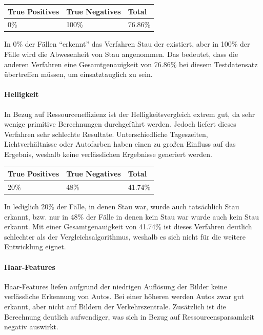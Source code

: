 \begin{center}
\scriptsize
    \begin{tabular}{ | l | l | l |}
    \hline
		True Positives & True Negatives & Total \\ \hline
    0\% &
		100\% &
		76.86\% \\
    \hline
    \end{tabular}
\end{center}

In 0\% der Fällen "`erkennt"' das Verfahren Stau der existiert, aber in 100\% der Fälle wird die Abwesenheit von Stau angenommen. Das bedeutet, dass die anderen Verfahren eine Gesamtgenauigkeit von 76.86\% bei diesem Testdatensatz übertreffen müssen, um einsatztauglich zu sein.

\paragraph{Helligkeit}
In Bezug auf Ressourceneffizienz ist der Helligkeitsvergleich extrem gut, da sehr wenige primitive Berechnungen durchgeführt werden.
Jedoch liefert dieses Verfahren sehr schlechte Resultate. Unterschiedliche Tageszeiten, Lichtverhältnisse oder Autofarben haben einen zu großen Einfluss auf das Ergebnis, weshalb keine verlässlichen Ergebnisse generiert werden.

\begin{center}
\scriptsize
    \begin{tabular}{ | l | l | l |}
    \hline
		True Positives & True Negatives & Total \\ \hline
    20\% &
		48\% &
		41.74\% \\
    \hline
    \end{tabular}
\end{center}

In lediglich 20\% der Fälle, in denen Stau war, wurde auch tatsächlich Stau erkannt, bzw. nur in 48\% der Fälle in denen kein Stau war wurde auch kein Stau erkannt.
Mit einer Gesamtgenauigkeit von 41.74\% ist dieses Verfahren deutlich schlechter als der Vergleichsalgorithmus, weshalb es sich nicht für die weitere Entwicklung eignet.

\paragraph{Haar-Features}
Haar-Features liefen aufgrund der niedrigen Auflösung der Bilder keine verlässliche Erkennung von Autos. Bei einer höheren werden Autos zwar gut erkannt, aber nicht auf Bildern der Verkehrszentrale. Zusätzlich ist die Berechnung deutlich aufwendiger, was sich in Bezug auf Ressourcensparsamkeit negativ auswirkt.

